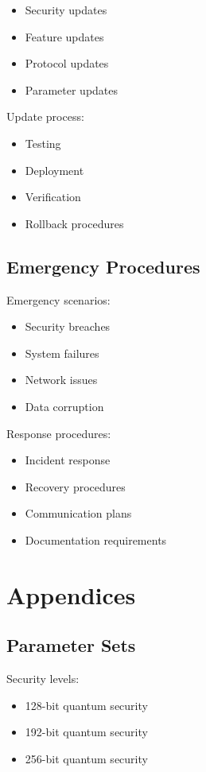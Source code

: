 \documentclass[12pt]{article}
\begin{document}
\begin{itemize}
\item Security updates
\item Feature updates
\item Protocol updates
\item Parameter updates
\end{itemize}

Update process:

\begin{itemize}
\item Testing
\item Deployment
\item Verification
\item Rollback procedures
\end{itemize}

\subsection{Emergency Procedures}

Emergency scenarios:

\begin{itemize}
\item Security breaches
\item System failures
\item Network issues
\item Data corruption
\end{itemize}

Response procedures:

\begin{itemize}
\item Incident response
\item Recovery procedures
\item Communication plans
\item Documentation requirements
\end{itemize}

\section{Appendices}

\subsection{Parameter Sets}

Security levels:

\begin{itemize}
\item 128-bit quantum security
\item 192-bit quantum security
\item 256-bit quantum security
\end{itemize}
\end{document}
